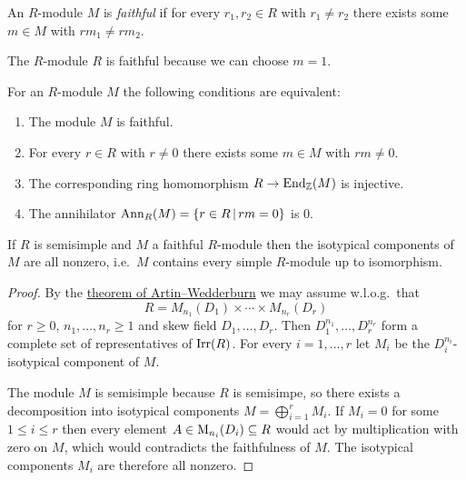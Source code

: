 \begin{definition}
  An $R$-module $M$ is \emph{faithful} if for every $r_1, r_2 \in R$ with $r_1 \neq r_2$ there exists some $m \in M$ with $r m_1 \neq r m_2$.
\end{definition}


\begin{example}
  The $R$-module $R$ is faithful because we can choose $m = 1$.
\end{example}


\begin{recall}
  For an $R$-module $M$ the following conditions are equivalent:
  \begin{enumerate}
    \item
      The module $M$ is faithful.
    \item
      For every $r \in R$ with $r \neq 0$ there exists some $m \in M$ with $rm \neq 0$.
    \item
      The corresponding ring homomorphism $R \to \operatorname{End}_{\mathbb{Z}}(M)$ is injective.
    \item
      The annihilator $\Ann_R(M) = \{r \in R \suchthat rm = 0\}$ is $0$.
  \end{enumerate}
\end{recall}


\begin{corollary}
  If $R$ is semisimple and $M$ a faithful $R$-module then the isotypical components of $M$ are all nonzero, i.e.\ $M$ contains every simple $R$-module up to isomorphism.
\end{corollary}


\begin{proof}
  By the \hyperref[theorem: artin wedderburn theorem]{theorem of Artin--Wedderburn} we may assume w.l.o.g.\ that
  \[
    R = M_{n_1}(D_1) \times \dotsb \times M_{n_r}(D_r)
  \]
  for $r \geq 0$, $n_1, \dotsc, n_r \geq 1$ and skew field $D_1, \dotsc, D_r$.
  Then $D_1^{n_1}, \dotsc, D_r^{n_r}$ form a complete set of representatives of $\operatorname{Irr}(R)$.
  For every $i = 1, \dotsc, r$ let $M_i$ be the $D_i^{n_i}$-isotypical component of $M$.
  
  The module $M$ is semisimple because $R$ is semisimpe, so there exists a decomposition into isotypical components $M = \bigoplus_{i=1}^r M_i$.
  If $M_i = 0$ for some $1 \leq i \leq r$ then every element $A \in \operatorname{M}_{n_i}(D_i) \subseteq R$ would act by multiplication with zero on $M$, which would contradicts the faithfulness of $M$.
  The isotypical components $M_i$ are therefore all nonzero.
\end{proof}




